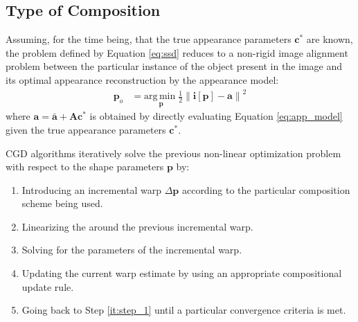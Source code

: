 \subsection{Type of Composition}
\label{sec:composition}

Assuming, for the time being, that the true appearance parameters $\mathbf{c}^*$ are known, the problem defined by Equation \ref{eq:ssd} reduces to a non-rigid image alignment problem \cite{Baker2004, Munoz2014} between the particular instance of the object present in the image and its optimal appearance reconstruction by the appearance model:
\begin{equation}
    \begin{aligned}
        \mathbf{p}_o & = \underset{\mathbf{p}}{\mathrm{arg\,min\;}} 
        \frac{1}{2}\left\| \mathbf{i}[\mathbf{p}] - \mathbf{a} \right\|^2 
    \label{eq:ssd_shape}
    \end{aligned}
\end{equation}
where $\mathbf{a} = \bar{\mathbf{a}} + \mathbf{A} \mathbf{c}^*$ is obtained by directly evaluating Equation \ref{eq:app_model} given the true appearance parameters $\mathbf{c}^*$.

CGD algorithms iteratively solve the previous non-linear optimization problem with respect to the shape parameters $\mathbf{p}$ by:
\begin{enumerate}
    \item Introducing an incremental warp $\Delta\mathbf{p}$ according to the particular composition scheme being used.
    \label{it:step_1}
    
    \item Linearizing the around the previous incremental warp.
    \label{it:step_2}
    
    \item Solving for the parameters of the incremental warp.
    \label{it:step_3}

    \item Updating the current warp estimate by using an appropriate compositional update rule.
    \label{it:step_4}

    \item Going back to Step \ref{it:step_1} until a particular convergence criteria is met.
    \label{it:step_5}
\end{enumerate}


